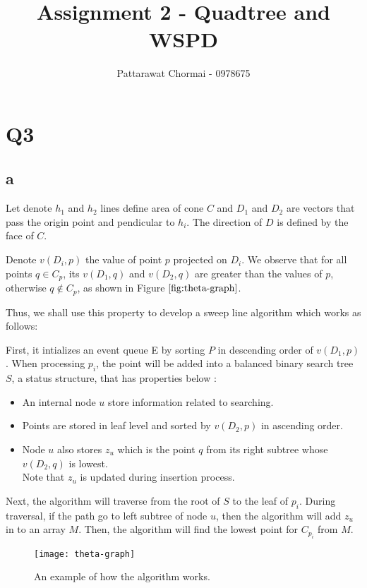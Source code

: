 \documentclass[12pt]{article}
\begin{document}
\title{Assignment 2 - Quadtree and WSPD}
\author{
	Pattarawat Chormai - 0978675 \\
}
\maketitle

\section*{Q3}

\subsection*{a}

Let denote $h_1$ and $h_2$ lines define area of cone $C$ and $D_1$ and $D_2$
are vectors that pass the origin point and pendicular to $h_i$. The direction
of $D$ is defined by the face of $C$.

Denote $v(D_i,p)$ the value of point $p$ projected on $D_i$. We observe that for
all points $q \in C_p$, its $v(D_1,q)$ and $v(D_2,q)$ are greater than
the values of $p$, otherwise $q \notin C_p$, as shown in Figure $\ref{fig:theta-graph}$.

Thus, we shall use this property to develop a sweep line algorithm which works
as follows:

First, it intializes an event queue E by sorting $P$ in descending order of $v(D_1,p)$.
When processing $p_i$, the point will be added into a balanced binary search tree $S$, a status structure,
that has properties below :
\begin{itemize}
    \item An internal node $u$ store information related to searching.
    \item Points are stored in leaf level and sorted by $v(D_2,p)$ in ascending order.
    \item Node $u$ also stores $z_u$ which is the point $q$ from its right subtree whose $v(D_2,q)$ is lowest. \\
        \;\; Note that $z_u$ is updated during insertion process.
\end{itemize}

Next, the algorithm will traverse from the root of $S$ to the leaf of $p_i$. During traversal,
if the path go to left subtree of node $u$, then the algorithm will add $z_u$ in to an array $M$.
Then, the algorithm will find the lowest point for $C_{p_i}$ from $M$.

\begin{center}
    \label{figure1}
    \begin{figure}[h]
    \centering
    \texttt{[image: theta-graph]}\\
    \caption{An example of how the algorithm works.} \label{fig:theta-graph}
    \end{figure}
\end{center}
\end{document}
